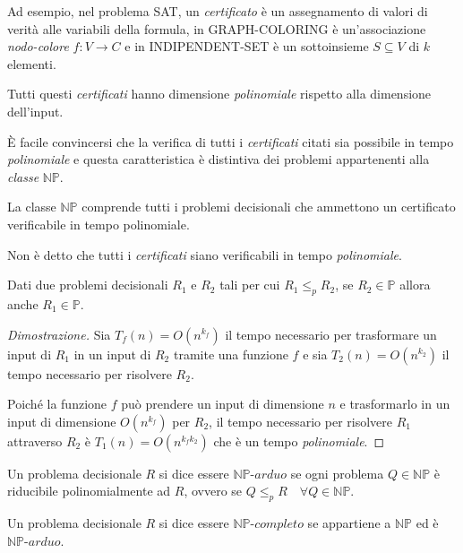 \noindent
Ad esempio, nel problema SAT, un \emph{certificato} è un assegnamento di
valori di verità alle variabili della formula, in GRAPH-COLORING è un'associazione
\emph{nodo-colore} $f:V\to C$ e in INDIPENDENT-SET è un sottoinsieme $S\subseteq V$
di $k$ elementi.
\begin{note}
    Tutti questi \emph{certificati} hanno dimensione \emph{polinomiale}
    rispetto alla dimensione dell'input.
\end{note}

\noindent
È facile convincersi che la verifica di tutti i \emph{certificati} citati sia
possibile in tempo \emph{polinomiale} e questa caratteristica è distintiva dei
problemi appartenenti alla \emph{classe} $\mathbb{NP}$.

\begin{definition}
    La classe $\mathbb{NP}$ comprende tutti i problemi decisionali che ammettono
    un certificato verificabile in tempo polinomiale.
\end{definition}
\begin{note}
    Non è detto che tutti i \emph{certificati} siano verificabili in tempo
    \emph{polinomiale}.
\end{note}

\begin{definition}
    Dati due problemi decisionali $R_1$ e $R_2$ tali per cui $R_1\leq_p R_2$,
    se $R_2\in\mathbb{P}$ allora anche $R_1\in\mathbb{P}$.
\end{definition}
\begin{proof}[Dimostrazione]
    Sia $T_f(n)=O(n^{k_f})$ il tempo necessario per trasformare un input di $R_1$
    in un input di $R_2$ tramite una funzione $f$ e sia $T_2(n)=O(n^{k_2})$ il
    tempo necessario per risolvere $R_2$.

    Poiché la funzione $f$ può prendere un input di dimensione $n$ e trasformarlo
    in un input di dimensione $O(n^{k_f})$ per $R_2$, il tempo necessario per
    risolvere $R_1$ attraverso $R_2$ è $T_1(n)=O(n^{k_fk_2})$ che è un
    tempo \emph{polinomiale}.
\end{proof}

\begin{definition}
    Un problema decisionale $R$ si dice essere $\mathbb{NP}\textit{-arduo}$ se
    ogni problema $Q\in\mathbb{NP}$ è riducibile polinomialmente ad $R$, ovvero
    se $Q\leq_p R\quad\forall Q\in\mathbb{NP}$.
\end{definition}
\begin{definition}
    Un problema decisionale $R$ si dice essere $\mathbb{NP}\textit{-completo}$ se
    appartiene a $\mathbb{NP}$ ed è $\mathbb{NP}\textit{-arduo}$.
\end{definition}

